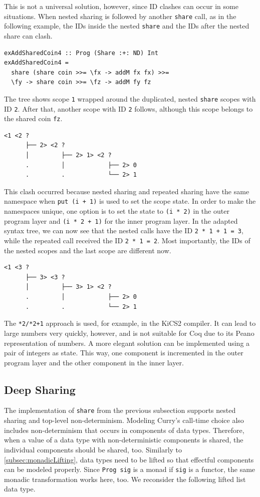 \documentclass[a4paper, 11pt, fleqn, twoside]{scrreprt}
\newcommand{\hinl}[1]{\texttt{#1}}
\begin{document}
This is not a universal solution, however, since ID clashes can occur in some situations.
When nested sharing is followed by another \hinl{share} call, as in the following example, the IDs inside the nested \hinl{share} and the IDs after the nested share can clash.

\begin{verbatim}
exAddSharedCoin4 :: Prog (Share :+: ND) Int
exAddSharedCoin4 =
  share (share coin >>= \fx -> addM fx fx) >>=
  \fy -> share coin >>= \fz -> addM fy fz
\end{verbatim}

The tree shows scope \hinl{1} wrapped around the duplicated, nested \hinl{share} scopes with ID \hinl{2}.
After that, another scope with ID \hinl{2} follows, although this scope belongs to the shared coin \hinl{fz}.

\begin{verbatim}
<1 <2 ? 
      ├── 2> <2 ? 
      │         ├── 2> 1> <2 ?
      .         │            ├── 2> 0
      .         .            └── 2> 1
\end{verbatim}

This clash occurred because nested sharing and repeated sharing have the same namespace when \hinl{put (i + 1)} is used to set the scope state.
In order to make the namespaces unique, one option is to set the state to \hinl{(i * 2)} in the outer program layer and \hinl{(i * 2 + 1)} for the inner program layer.
In the adapted syntax tree, we can now see that the nested calls have the ID \hinl{2 * 1 + 1 = 3}, while the repeated call received the ID \hinl{2 * 1 = 2}.
Most importantly, the IDs of the nested scopes and the last scope are different now.

\begin{verbatim}
<1 <3 ? 
      ├── 3> <3 ? 
      │         ├── 3> 1> <2 ? 
      .         │            ├── 2> 0
      .         .            └── 2> 1

\end{verbatim}

The \hinl{*2/*2+1} approach is used, for example, in the KiCS2 compiler.
It can lead to large numbers very quickly, however, and is not suitable for Coq due to its Peano representation of numbers.
A more elegant solution can be implemented using a pair of integers as state.
This way, one component is incremented in the outer program layer and the other component in the inner layer.

\subsection{Deep Sharing}
The implementation of \hinl{share} from the previous subsection supports nested sharing and top-level non-determinism.
Modeling Curry's call-time choice also includes non-determinism that occurs in components of data types.
Therefore, when a value of a data type with non-deterministic components is shared, the individual components should be shared, too.
Similarly to \autoref{subsec:monadicLifting}, data types need to be lifted so that effectful components can be modeled properly.
Since \hinl{Prog sig} is a monad if \hinl{sig} is a functor, the same monadic transformation works here, too.
We reconsider the following lifted list data type.
\end{document}
